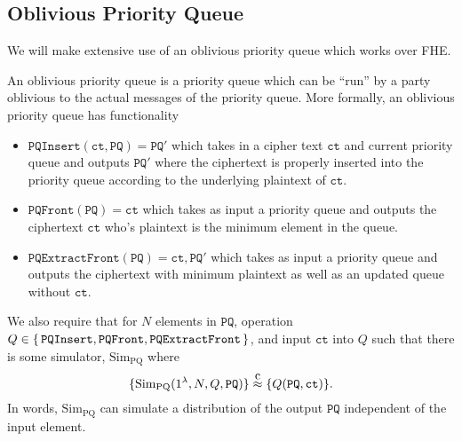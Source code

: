 \newcommand{\ct}{\texttt{ct}}

\subsection{Oblivious Priority Queue}
We will make extensive use of an oblivious priority queue which works over FHE.

\newcommand\compInd{\stackrel{\mathclap{\normalfont\mbox{c}}}{\approx}}
\newcommand{\PQInsert}{\texttt{PQInsert}}
\newcommand{\PQFront}{\texttt{PQFront}}
\newcommand{\PQExtractFront}{\texttt{PQExtractFront}}
\newcommand{\simulator}{\text{Sim}}
\newcommand{\simulatorPQ}{\text{Sim}_\text{PQ}}
\newcommand{\PQ}{\texttt{PQ}}
\newcommand{\hybrid}[1]{\mathrm{\textbf{Hyb}}_{#1}}

\begin{definition}
	An oblivious priority queue is a priority queue which can be ``run'' by a party oblivious to the actual
	messages of the priority queue. More formally, an oblivious priority queue has functionality
	\begin{itemize}
		\item $\PQInsert(\ct, \PQ) = \PQ'$ which takes in a cipher text $\ct$ and current priority queue and outputs $\PQ'$ where 
		the ciphertext is properly inserted into the priority queue according to the underlying plaintext of $\ct$.
		\item $\PQFront(\PQ) = \ct$ which takes as input a priority queue and outputs the ciphertext $\ct$ who's plaintext is the minimum element in the queue.
		\item $\PQExtractFront(\PQ) = \ct, \PQ'$ which takes as input a priority queue and outputs the ciphertext with minimum plaintext as well as an updated queue without $\ct$.
	\end{itemize}
	We also require that for $N$ elements in $\PQ$, operation $Q \in \set{\PQInsert, \PQFront, \PQExtractFront}$,
	and input $\ct$ into $Q$ such that there is some simulator, $\simulatorPQ$ where
	\begin{equation}
		\{\simulatorPQ(1^\lambda, N, Q, \PQ) \} \compInd	\{Q(\PQ, \ct) \}.
	\end{equation}
	In words, $\simulatorPQ$ can simulate a distribution of the output $\PQ$ independent of the input element.
\end{definition}

